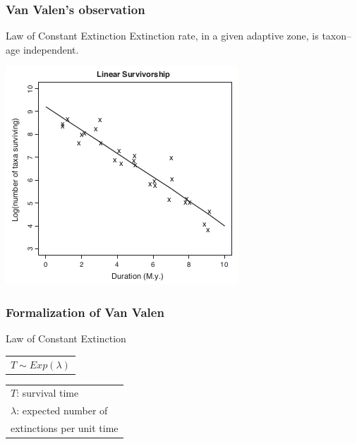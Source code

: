 \documentclass{beamer}
\begin{document}
\begin{frame}
  \frametitle{Van Valen's observation}

  \begin{alertblock}{Law of Constant Extinction}
    Extinction rate, in a given adaptive zone, is taxon--age independent.

    \tiny{}
  \end{alertblock}

  \begin{center}
    \includegraphics[height = 0.5\textheight, keepaspectratio = true]{figure/liow}

    \tiny{}
  \end{center}
\end{frame}

\begin{frame}
  \frametitle{Formalization of Van Valen}

  \begin{block}{Law of Constant Extinction}
    \begin{center}
      \begin{tabular}{@{}l@{}}\(T \sim Exp(\lambda)\)\end{tabular}
      \hspace{1.5cm}
      \begin{tabular}{@{}l@{}}\(T\): survival time\\\(\lambda\): expected number of \\extinctions per unit time\end{tabular}
    \end{center}
  \end{block}
\end{frame}
\end{document}
